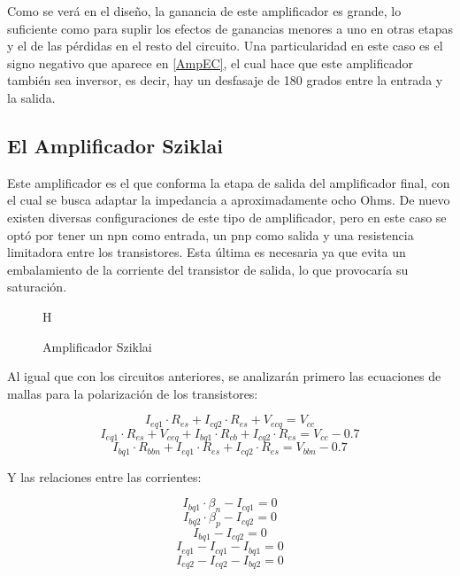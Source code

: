 Como se verá en el diseño, la ganancia de este amplificador es grande, lo suficiente como para suplir los efectos de ganancias menores a uno en otras etapas y el de las pérdidas en el resto del circuito. Una particularidad en este caso es el signo negativo que aparece en \cref{AmpEC}, el cual hace que este amplificador también sea inversor, es decir, hay un desfasaje de 180 grados entre la entrada y la salida.

\subsection{El Amplificador Sziklai}

Este amplificador es el que conforma la etapa de salida del amplificador final, con el cual se busca adaptar la impedancia a aproximadamente ocho Ohms. De nuevo existen diversas configuraciones de este tipo de amplificador, pero en este caso se optó por tener un npn como entrada, un pnp como salida y una resistencia limitadora entre los transistores. Esta última es necesaria ya que evita un embalamiento de la corriente del transistor de salida, lo que provocaría su saturación.

\begin{figure}{H}
    \centering
    
    \caption{Amplificador Sziklai}
    \label{fig:Sz}
\end{figure}

Al igual que con los circuitos anteriores, se analizarán primero las ecuaciones de mallas para la polarización de los transistores:

\begin{equation}
    I_{eq1} \cdot R_{es} + I_{cq2}\cdot R_{es} + V_{ecq} = V_{cc}
    \label{MSSz}
\end{equation}
\begin{equation}
    I_{eq1}\cdot R_{es} + V_{ceq} + I_{bq1}\cdot R_{cb} + I_{cq2}\cdot R_{es} = V_{cc}-0.7
    \label{MMSz}
\end{equation}
\begin{equation}
    I_{bq1}\cdot R_{bbn} + I_{eq1}\cdot R_{es} + I_{cq2} \cdot R_{es} = V_{bbn} -0.7
    \label{MESz}
\end{equation}

Y las relaciones entre las corrientes:

\begin{equation}
    I_{bq1}\cdot \beta_{n} - I_{cq1} = 0
    \label{AmpNSz}
\end{equation}
\begin{equation}
    I_{bq2}\cdot \beta_{p} - I_{cq2} = 0
    \label{AmpPSz}
\end{equation}
\begin{equation}
    I_{bq1} - I_{cq2} = 0
    \label{RelCorNP}
\end{equation}
\begin{equation}
    I_{eq1} - I_{cq1} - I_{bq1} = 0
    \label{CorNPNSz}
\end{equation}
\begin{equation}
    I_{eq2} - I_{cq2} - I_{bq2} = 0
    \label{CorPNPSz}
\end{equation}

